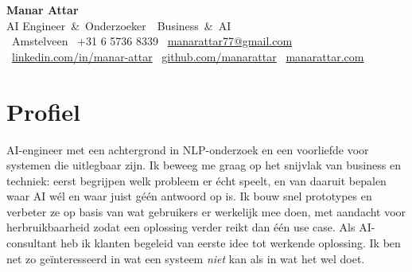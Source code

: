 \documentclass[10pt]{article}
\begin{document}
\begin{center}
  {\Huge\bfseries\color{navy} Manar Attar}\\[3pt]
  {\large\color{gray} AI Engineer \,\&\, Onderzoeker \,\textbar\, Business \,\&\, AI}\\[5pt]
  {\small
    \faMapMarker*\, Amstelveen \quad
    \faPhone*\, +31 6 5736 8339 \quad
    \faEnvelope\, \href{mailto:manarattar77@gmail.com}{manarattar77@gmail.com}\\[2pt]
    \faLinkedin\, \href{https://linkedin.com/in/manar-attar}{linkedin.com/in/manar-attar} \quad
    \faGithub\, \href{https://github.com/manarattar}{github.com/manarattar} \quad
    \faGlobe\, \href{https://manarattar.com}{manarattar.com}}
\end{center}
\vspace{-2pt}

\section*{Profiel}
\vspace{-2pt}
{\small AI-engineer met een achtergrond in NLP-onderzoek en een voorliefde voor systemen die uitlegbaar zijn. Ik beweeg me graag op het snijvlak van business en techniek: eerst begrijpen welk probleem er écht speelt, en van daaruit bepalen waar AI wél en waar juist géén antwoord op is. Ik bouw snel prototypes en verbeter ze op basis van wat gebruikers er werkelijk mee doen, met aandacht voor herbruikbaarheid zodat een oplossing verder reikt dan één use case. Als AI-consultant heb ik klanten begeleid van eerste idee tot werkende oplossing. Ik ben net zo geïnteresseerd in wat een systeem \emph{niet} kan als in wat het wel doet.}

\end{document}
